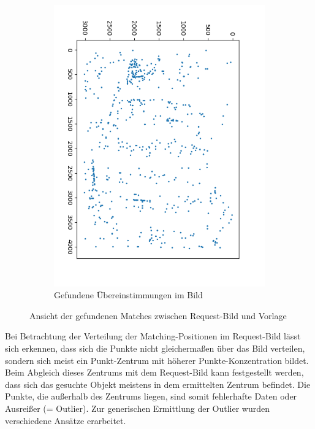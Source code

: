 \documentclass[
    type=Prakikumsbericht,
    status=draft, %
    language=german, %
    bibengine=bibtex,
]{unibwm-inf-thesis}
\begin{document}
\begin{figure}[b]
\begin{subfigure}{0.5\textwidth}
            \includegraphics[width=1.0\textwidth]{images/Request_plot}
            \caption{Gefundene Übereinstimmungen im Bild}
            \label{fig:sub3}
        \end{subfigure}
        \caption{Ansicht der gefundenen Matches zwischen Request-Bild und Vorlage}
        \label{fig:plottedMatches}
    \end{figure}

    Bei Betrachtung der Verteilung der Matching-Positionen im Request-Bild lässt sich erkennen, dass sich die Punkte nicht gleichermaßen über das Bild verteilen, sondern sich meist ein Punkt-Zentrum mit höherer Punkte-Konzentration bildet.
    Beim Abgleich dieses Zentrums mit dem Request-Bild kann festgestellt werden, dass sich das gesuchte Objekt meistens in dem ermittelten Zentrum befindet.
    Die Punkte, die außerhalb des Zentrums liegen, sind somit fehlerhafte Daten oder Ausreißer (= Outlier).
    Zur generischen Ermittlung der Outlier wurden verschiedene Ansätze erarbeitet.
\end{document}

